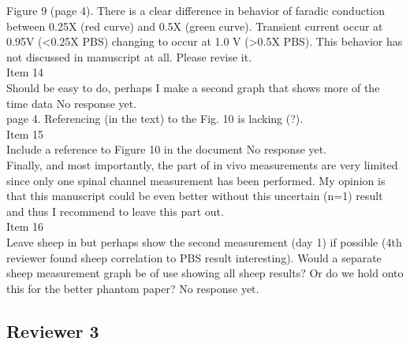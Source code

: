 \documentclass[journal, a4paper]{IEEEtran}
\begin{document}
{Figure 9 (page 4). There is a clear difference in behavior of faradic conduction between 0.25X (red curve) and 0.5X (green curve). Transient current occur at 0.95V (<0.25X PBS) changing to occur at 1.0 V (>0.5X PBS). This behavior has not discussed in manuscript at all. Please revise it.\\
{\color{OliveGreen}
    Item 14\\
    {\color{Red} Should be easy to do, perhaps I make a second graph that shows more of the time data}
    No response yet.
}\\

page 4. Referencing (in the text) to the Fig. 10 is lacking (?).\\
{\color{OliveGreen}
    Item 15\\
    {\color{Red} Include a reference to Figure 10 in the document}
    No response yet.
}\\

Finally, and most importantly, the part of in vivo measurements are very limited since only one spinal channel measurement has been performed. My opinion is that this manuscript could be even better without this uncertain (n=1) result and thus I recommend to leave this part out.\\
{\color{OliveGreen}
    Item 16\\ 
    {\color{Red} Leave sheep in but perhaps show the second measurement (day 1) if possible (4th reviewer found sheep correlation to PBS result interesting). Would a separate sheep measurement graph be of use showing all sheep results? Or do we hold onto this for the better phantom paper?}
    No response yet.
}\\
}

\subsection*{Reviewer 3}
\end{document}
